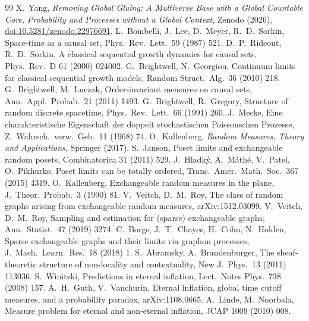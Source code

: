 \documentclass[11pt]{article}
\theoremstyle{definition}
\theoremstyle{remark}
\begin{document}
\begin{thebibliography}{99}\small
{} X.~Yang, \emph{Removing Global Gluing: A Multiverse Base with a Global Countable Core, Probability and Processes without a Global Context}, Zenodo (2026), \href{https://doi.org/10.5281/zenodo.22976691}{doi:10.5281/zenodo.22976691}.
 L.~Bombelli, J.~Lee, D.~Meyer, R.~D.~Sorkin, Space-time as a causal set, Phys.\ Rev.\ Lett.\ 59 (1987) 521.
 D.~P.~Rideout, R.~D.~Sorkin, A classical sequential growth dynamics for causal sets, Phys.\ Rev.\ D 61 (2000) 024002.
 G.~Brightwell, N.~Georgiou, Continuum limits for classical sequential growth models, Random Struct.\ Alg.\ 36 (2010) 218.
 G.~Brightwell, M.~Luczak, Order-invariant measures on causal sets, Ann.\ Appl.\ Probab.\ 21 (2011) 1493.
 G.~Brightwell, R.~Gregory, Structure of random discrete spacetime, Phys.\ Rev.\ Lett.\ 66 (1991) 260.
 J.~Mecke, Eine charakteristische Eigenschaft der doppelt stochastischen Poissonschen Prozesse, Z.\ Wahrsch.\ verw.\ Geb.\ 11 (1968) 74.
 O.~Kallenberg, \emph{Random Measures, Theory and Applications}, Springer (2017).
 S.~Janson, Poset limits and exchangeable random posets, Combinatorica 31 (2011) 529.
 J.~Hladk\'y, A.~M\'ath\'e, V.~Patel, O.~Pikhurko, Poset limits can be totally ordered, Trans.\ Amer.\ Math.\ Soc.\ 367 (2015) 4319.
 O.~Kallenberg, Exchangeable random measures in the plane, J.\ Theor.\ Probab.\ 3 (1990) 81.
 V.~Veitch, D.~M.~Roy, The class of random graphs arising from exchangeable random measures, arXiv:1512.03099.
 V.~Veitch, D.~M.~Roy, Sampling and estimation for (sparse) exchangeable graphs, Ann.\ Statist.\ 47 (2019) 3274.
 C.~Borgs, J.~T.~Chayes, H.~Cohn, N.~Holden, Sparse exchangeable graphs and their limits via graphon processes, J.\ Mach.\ Learn.\ Res.\ 18 (2018) 1.
 S.~Abramsky, A.~Brandenburger, The sheaf-theoretic structure of non-locality and contextuality, New J.\ Phys.\ 13 (2011) 113036.
 S.~Winitzki, Predictions in eternal inflation, Lect.\ Notes Phys.\ 738 (2008) 157.
 A.~H.~Guth, V.~Vanchurin, Eternal inflation, global time cutoff measures, and a probability paradox, arXiv:1108.0665.
 A.~Linde, M.~Noorbala, Measure problem for eternal and non-eternal inflation, JCAP 1009 (2010) 008.

\end{thebibliography}
\end{document}
